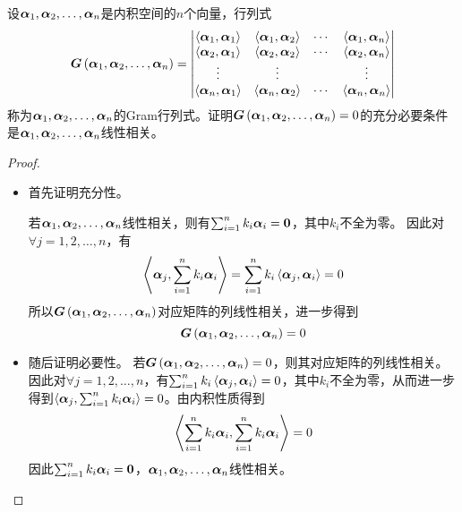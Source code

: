 \setcounter{problem}{19}
\begin{problem}
设\(\enums{\vecal}{n}\)是内积空间的\(n\)个向量，行列式
\begin{equation*}
    \gram{\enums{\vecal}{n}}=
    \begin{vmatrix}
        \indot{\vecal_1}{\vecal_1} & \indot{\vecal_1}{\vecal_2} & \cdots & \indot{\vecal_1}{\vecal_n} \\
        \indot{\vecal_2}{\vecal_1} & \indot{\vecal_2}{\vecal_2} & \cdots & \indot{\vecal_2}{\vecal_n} \\
        \vdots                     & \vdots                     &        & \vdots                     \\
        \indot{\vecal_n}{\vecal_1} & \indot{\vecal_n}{\vecal_2} & \cdots & \indot{\vecal_n}{\vecal_n}
    \end{vmatrix}
\end{equation*}
称为\(\enums{\vecal}{n}\)的Gram行列式。证明\(\gram{\enums{\vecal}{n}}=0\)的充分必要条件是\(\enums{\vecal}{n}\)线性相关。
\end{problem}
\begin{proof}
    \begin{itemize}
        \item {
              首先证明充分性。

              若\(\enums{\vecal}{n}\)线性相关，则有\(\sum_{i=1}^nk_i\vecal_i=\veczero\)，其中\(k_i\)不全为零。
              因此对\(\forall j=1,2,\dots,n\)，有
              \begin{equation*}
                  \indot{\vecal_j}{\sum_{i=1}^nk_i\vecal_i}=\sum_{i=1}^nk_i\indot{\vecal_j}{\vecal_i}=0
              \end{equation*}
              所以\(\gram{\enums{\vecal}{n}}\)对应矩阵的列线性相关，进一步得到
              \begin{equation*}
                  \gram{\enums{\vecal}{n}}=0
              \end{equation*}
              }
        \item {
              随后证明必要性。
              若\(\gram{\enums{\vecal}{n}}=0\)，则其对应矩阵的列线性相关。因此对\(\forall j=1,2,\dots,n\)，有\(\sum_{i=1}^nk_i\indot{\vecal_j}{\vecal_i}=0\)，其中\(k_i\)不全为零，从而进一步得到\(\indot{\vecal_j}{\sum_{i=1}^nk_i\vecal_i}=0\)。由内积性质得到
              \begin{equation*}
                  \indot{\sum_{i=1}^nk_i\vecal_i}{\sum_{i=1}^nk_i\vecal_i}=0
              \end{equation*}
              因此\(\sum_{i=1}^nk_i\vecal_i=\veczero\)，\(\enums{\vecal}{n}\)线性相关。
              }
    \end{itemize}
\end{proof}

